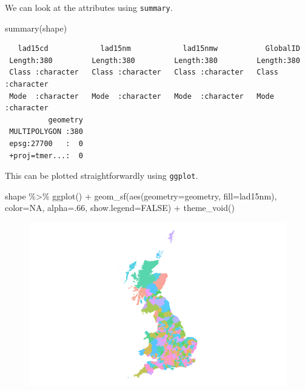 \documentclass[
  letterpaper,
]{book}
\newenvironment{Shaded}{\begin{snugshade}}{\end{snugshade}}
\newcommand{\AttributeTok}[1]{\textcolor[rgb]{0.40,0.45,0.13}{#1}}
\newcommand{\ConstantTok}[1]{\textcolor[rgb]{0.56,0.35,0.01}{#1}}
\newcommand{\DecValTok}[1]{\textcolor[rgb]{0.68,0.00,0.00}{#1}}
\newcommand{\FunctionTok}[1]{\textcolor[rgb]{0.28,0.35,0.67}{#1}}
\newcommand{\NormalTok}[1]{\textcolor[rgb]{0.00,0.23,0.31}{#1}}
\newcommand{\SpecialCharTok}[1]{\textcolor[rgb]{0.37,0.37,0.37}{#1}}
\begin{document}
We can look at the attributes using \texttt{summary}.

\begin{Shaded}
\begin{Highlighting}[]
\FunctionTok{summary}\NormalTok{(shape)}
\end{Highlighting}
\end{Shaded}

\begin{verbatim}
   lad15cd            lad15nm            lad15nmw           GlobalID        
 Length:380         Length:380         Length:380         Length:380        
 Class :character   Class :character   Class :character   Class :character  
 Mode  :character   Mode  :character   Mode  :character   Mode  :character  
          geometry  
 MULTIPOLYGON :380  
 epsg:27700   :  0  
 +proj=tmer...:  0  
\end{verbatim}

This can be plotted straightforwardly using \texttt{ggplot}.

\begin{Shaded}
\begin{Highlighting}[]
\NormalTok{shape }\SpecialCharTok{\%\textgreater{}\%}
  \FunctionTok{ggplot}\NormalTok{() }\SpecialCharTok{+}
  \FunctionTok{geom\_sf}\NormalTok{(}\FunctionTok{aes}\NormalTok{(}\AttributeTok{geometry=}\NormalTok{geometry, }\AttributeTok{fill=}\NormalTok{lad15nm), }
          \AttributeTok{color=}\ConstantTok{NA}\NormalTok{, }\AttributeTok{alpha=}\NormalTok{.}\DecValTok{66}\NormalTok{, }\AttributeTok{show.legend=}\ConstantTok{FALSE}\NormalTok{) }\SpecialCharTok{+}
  \FunctionTok{theme\_void}\NormalTok{()}
\end{Highlighting}
\end{Shaded}

\begin{figure}[H]

{\centering \includegraphics{Maps_files/figure-pdf/map0a-1.pdf}

}

\end{figure}
\end{document}
